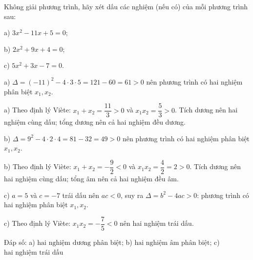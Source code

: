 \begin{problem}[9DS-PT2-023]
Không giải phương trình, hãy xét dấu các nghiệm (nếu có) của mỗi phương trình sau:

a) $3x^2 - 11x + 5 = 0$;

b) $2x^2 + 9x + 4 = 0$;

c) $5x^2 + 3x - 7 = 0$.

\begin{solution}
a) $\Delta = (-11)^2 - 4 \cdot 3 \cdot 5 = 121 - 60 = 61 > 0$ nên phương trình có hai nghiệm phân biệt $x_1, x_2$.

a) Theo định lý Viète: $x_1 + x_2 = \dfrac{11}{3} > 0$ và $x_1 x_2 = \dfrac{5}{3} > 0$. Tích dương nên hai nghiệm cùng dấu; tổng dương nên cả hai nghiệm đều dương.

b) $\Delta = 9^2 - 4 \cdot 2 \cdot 4 = 81 - 32 = 49 > 0$ nên phương trình có hai nghiệm phân biệt $x_1, x_2$.

b) Theo định lý Viète: $x_1 + x_2 = -\dfrac{9}{2} < 0$ và $x_1 x_2 = \dfrac{4}{2} = 2 > 0$. Tích dương nên hai nghiệm cùng dấu; tổng âm nên cả hai nghiệm đều âm.

c) $a = 5$ và $c = -7$ trái dấu nên $ac < 0$, suy ra $\Delta = b^2 - 4ac > 0$: phương trình có hai nghiệm phân biệt $x_1, x_2$.

c) Theo định lý Viète: $x_1 x_2 = -\dfrac{7}{5} < 0$ nên hai nghiệm trái dấu.

Đáp số: a) $\boxed{\text{hai nghiệm dương phân biệt}}$; b) $\boxed{\text{hai nghiệm âm phân biệt}}$; c) $\boxed{\text{hai nghiệm trái dấu}}$
\end{solution}
\end{problem}

